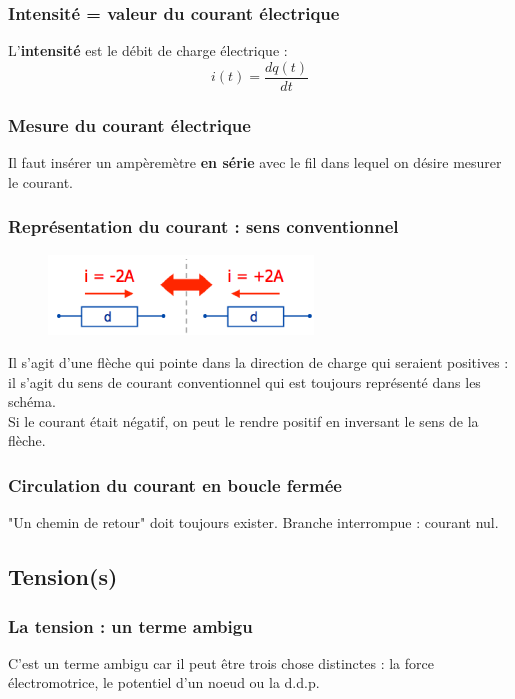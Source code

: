 \documentclass	[11pt, a4paper, openany]{book}
\begin{document}
\subsubsection{Intensité = valeur du courant électrique}
L'\textbf{intensité} est le débit de charge électrique :
\begin{equation}
i(t) = \frac{dq(t)}{dt}
\end{equation}

\subsubsection{Mesure du courant électrique}
Il faut insérer un ampèremètre \textbf{en série} avec le fil dans lequel on désire mesurer le courant.

\subsubsection{Représentation du courant : sens conventionnel}
\begin{figure}
\includegraphics[scale=0.5]{img/image3.png}
\end{figure}
Il s'agit d'une flèche qui pointe dans la direction de charge qui seraient positives : il s'agit du sens de courant conventionnel qui est toujours représenté dans les schéma.\\
Si le courant était négatif, on peut le rendre positif en inversant le sens de la flèche.

\subsubsection{Circulation du courant en boucle fermée}
"Un chemin de retour" doit toujours exister. Branche interrompue : courant nul.

\subsection{Tension(s)}
\subsubsection{La tension : un terme ambigu}
C'est un terme ambigu car il peut être trois chose distinctes : la force électromotrice, le potentiel d'un noeud ou la d.d.p.
\end{document}
